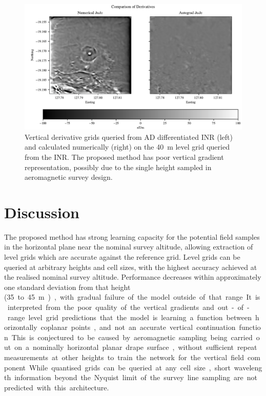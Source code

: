 \begin{figure}[hbtp]
    \centering{}
    \includegraphics[width=1\linewidth]{fig/p3/P864_dv_comparison.pdf}
    \caption[Vertical derivative]{Vertical derivative grids queried from AD differentiated INR (left) and calculated numerically (right) on the \qty{40}{\m} level grid queried from the INR\@.
        The proposed method has poor vertical gradient representation, possibly due to the single height sampled in aeromagnetic survey design.}
    \label{fig:vertgrad}
\end{figure}

\section{Discussion}
\label{sec:3discussion}
The proposed method has strong learning capacity for the potential field samples in the horizontal plane near the nominal survey altitude, allowing extraction of level grids which are accurate against the reference grid.
Level grids can be queried at arbitrary heights and cell sizes, with the highest accuracy achieved at the realised nominal survey altitude.
Performance decreases within approximately one standard deviation from that height (\qty{35} to \qty{45}{\m}), with gradual failure of the model outside of that range.
It is interpreted from the poor quality of the vertical gradients and out-of-range level grid predictions that the model is learning a function between horizontally coplanar points, and not an accurate vertical continuation function.
This is conjectured to be caused by aeromagnetic sampling being carried out on a nominally horizontal planar drape surface, without sufficient repeat measurements at other heights to train the network for the vertical field component.

While quantised grids can be queried at any cell size, short wavelength information beyond the Nyquist limit of the survey line sampling are not predicted with this architecture.

